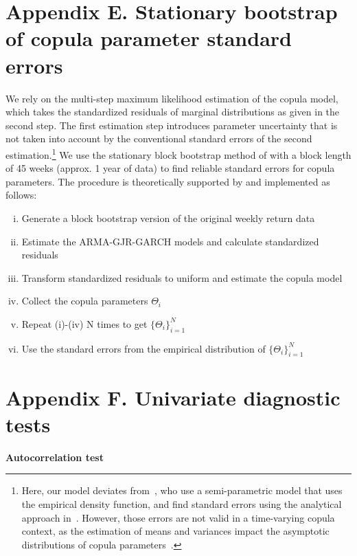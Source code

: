 \newpage

\section{Appendix E. Stationary bootstrap of copula parameter standard errors} \label{App:Appendix_bootstrap}
We rely on the multi-step maximum likelihood estimation of the copula model, which takes the standardized residuals of marginal distributions as given in the second step. The first estimation step introduces parameter uncertainty that is not taken into account by the conventional standard errors of the second estimation.\footnote{Here, our model deviates from~\textcite{ChristoffersenLanglois2013}, who use a semi-parametric model that uses the empirical density function, and find standard errors using the analytical approach in~\textcite{ChenFan2006}. However, those errors are not valid in a time-varying copula context, as the estimation of means and variances impact the asymptotic distributions of copula parameters~\autocite{Remillard2010}.} We use the stationary block bootstrap method of \textcite{PolitisRomano1994} with a block length of 45 weeks (approx. 1 year of data) to find reliable standard errors for copula parameters. The procedure is theoretically supported by \textcite{GonclavesWhite2004} and implemented as follows:
\begin{enumerate}[(i)]
    \item Generate a block bootstrap version of the original weekly return data
    \item Estimate the ARMA-GJR-GARCH models and calculate standardized residuals
    \item Transform standardized residuals to uniform and estimate the copula model
    \item Collect the copula parameters $\Theta_i$
    \item Repeat (i)-(iv) N times to get $\{\Theta_i\}^{N}_{i=1}$
    \item Use the standard errors from the empirical distribution of $\{\Theta_i\}^{N}_{i=1}$
\end{enumerate}

\newpage

\section{Appendix F. Univariate diagnostic tests}
\label{app:univariate_diagnostics}

\textbf{Autocorrelation test}

